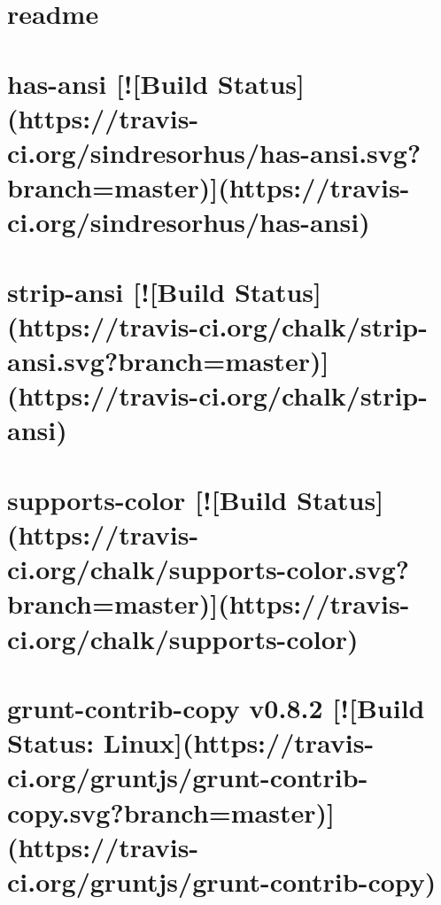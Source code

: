 \documentclass[twoside]{book}
\newcommand{\+}{\discretionary{\mbox{\scriptsize$\hookleftarrow$}}{}{}}
\begin{document}
\chapter{readme}
\label{md_app_web_node_modules_grunt-contrib-copy_node_modules_chalk_readme}

\chapter{has-\/ansi \mbox{[}!\mbox{[}Build Status\mbox{]}(https\+://travis-\/ci.org/sindresorhus/has-\/ansi.svg?branch=master)\mbox{]}(https\+://travis-\/ci.org/sindresorhus/has-\/ansi)}
\label{md_app_web_node_modules_grunt-contrib-copy_node_modules_has-ansi_readme}

\chapter{strip-\/ansi \mbox{[}!\mbox{[}Build Status\mbox{]}(https\+://travis-\/ci.org/chalk/strip-\/ansi.svg?branch=master)\mbox{]}(https\+://travis-\/ci.org/chalk/strip-\/ansi)}
\label{md_app_web_node_modules_grunt-contrib-copy_node_modules_strip-ansi_readme}

\chapter{supports-\/color \mbox{[}!\mbox{[}Build Status\mbox{]}(https\+://travis-\/ci.org/chalk/supports-\/color.svg?branch=master)\mbox{]}(https\+://travis-\/ci.org/chalk/supports-\/color)}
\label{md_app_web_node_modules_grunt-contrib-copy_node_modules_supports-color_readme}

\chapter{grunt-\/contrib-\/copy v0.8.2 \mbox{[}!\mbox{[}Build Status\+: Linux\mbox{]}(https\+://travis-\/ci.org/gruntjs/grunt-\/contrib-\/copy.svg?branch=master)\mbox{]}(https\+://travis-\/ci.org/gruntjs/grunt-\/contrib-\/copy)}
\label{md_app_web_node_modules_grunt-contrib-copy__r_e_a_d_m_e}

\end{document}
